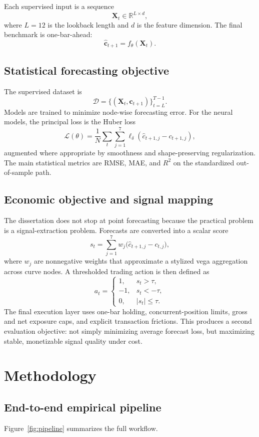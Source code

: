\documentclass[12pt]{report}
\begin{document}
Each supervised input is a sequence
\[
\mathbf{X}_t \in \mathbb{R}^{L\times d},
\]
where \(L=12\) is the lookback length and \(d\) is the feature dimension. The final benchmark is one-bar-ahead:
\[
\hat{\mathbf{c}}_{t+1}=f_\theta(\mathbf{X}_t).
\]

\section{Statistical forecasting objective}
The supervised dataset is
\[
\mathcal{D}=\{(\mathbf{X}_t,\mathbf{c}_{t+1})\}_{t=L}^{T-1}.
\]
Models are trained to minimize node-wise forecasting error. For the neural models, the principal loss is the Huber loss
\[
\mathcal{L}(\theta)=\frac{1}{N}\sum_t\sum_{j=1}^{7}\ell_\delta\!\left(\hat{c}_{t+1,j}-c_{t+1,j}\right),
\]
augmented where appropriate by smoothness and shape-preserving regularization. The main statistical metrics are RMSE, MAE, and \(R^2\) on the standardized out-of-sample path.

\section{Economic objective and signal mapping}
The dissertation does not stop at point forecasting because the practical problem is a signal-extraction problem. Forecasts are converted into a scalar score
\[
s_t=\sum_{j=1}^{7}w_j\big(\hat{c}_{t+1,j}-c_{t,j}\big),
\]
where \(w_j\) are nonnegative weights that approximate a stylized vega aggregation across curve nodes. A thresholded trading action is then defined as
\[
a_t=
\begin{cases}
1, & s_t>\tau,\\
-1, & s_t<-\tau,\\
0, & |s_t|\le \tau.
\end{cases}
\]
The final execution layer uses one-bar holding, concurrent-position limits, gross and net exposure caps, and explicit transaction frictions. This produces a second evaluation objective: not simply minimizing average forecast loss, but maximizing stable, monetizable signal quality under cost.

\chapter{Methodology}

\section{End-to-end empirical pipeline}
Figure~\ref{fig:pipeline} summarizes the full workflow.
\end{document}
